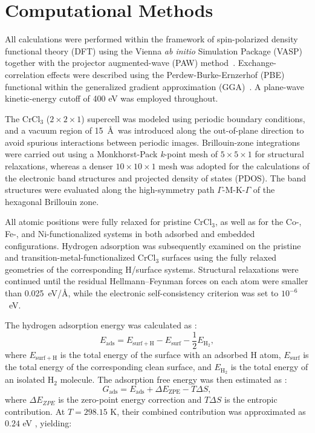 \documentclass[journal=jacsat,manuscript=article]{achemso}
\begin{document}
\section{Computational Methods}

All calculations were performed within the framework of spin-polarized density functional theory (DFT) using the Vienna \textit{ab initio} Simulation Package (VASP)~\cite{Kresse1996CMS,Kresse1996PRB} together with the projector augmented-wave (PAW) method~\cite{Blochl1994,Kresse1999}. Exchange-correlation effects were described using the Perdew-Burke-Ernzerhof (PBE) functional within the generalized gradient approximation (GGA)~\cite{PhysRevLett.77.3865}. A plane-wave kinetic-energy cutoff of 400 eV was employed throughout.

The CrCl$_3$ ($2 \times 2 \times 1$) supercell was modeled using periodic boundary conditions, and a vacuum region of 15~\AA\ was introduced along the out-of-plane direction to avoid spurious interactions between periodic images. Brillouin-zone integrations were carried out using a Monkhorst-Pack \cite{Monkhorst1976} \textit{k}-point mesh of $5 \times 5 \times 1$ for structural relaxations, whereas a denser $10 \times 10 \times 1$ mesh was adopted for the calculations of the electronic band structures and projected density of states (PDOS). The band structures were evaluated along the high-symmetry path $\Gamma$-M-K-$\Gamma$ of the hexagonal Brillouin zone.

All atomic positions were fully relaxed for pristine CrCl$_3$, as well as for the Co-, Fe-, and Ni-functionalized systems in both adsorbed and embedded configurations. Hydrogen adsorption was subsequently examined on the pristine and transition-metal-functionalized CrCl$_3$ surfaces using the fully relaxed geometries of the corresponding H/surface systems. Structural relaxations were continued until the residual Hellmann--Feynman forces on each atom were smaller than 0.025~eV/\AA, while the electronic self-consistency criterion was set to $10^{-6}$~eV.

The hydrogen adsorption energy was calculated as \cite{https://doi.org/10.1002/eem2.12204,doi:10.1021/acsomega.5c07529}:
\begin{equation}
    E_{\mathrm{ads}} = E_{\mathrm{surf+H}} - E_{\mathrm{surf}} - \frac{1}{2}E_{\mathrm{H_2}},
\end{equation}
where $E_{\mathrm{surf+H}}$ is the total energy of the surface with an adsorbed H atom, $E_{\mathrm{surf}}$ is the total energy of the corresponding clean surface, and $E_{\mathrm{H_2}}$ is the total energy of an isolated H$_2$ molecule. The adsorption free energy was then estimated as \cite{https://doi.org/10.1002/eem2.12204,doi:10.1021/acsomega.5c07529}:
\begin{equation}
    G_{\mathrm{ads}} = E_{\mathrm{ads}} + \Delta E_{\mathrm{ZPE}} - T\Delta S,
\end{equation}
where $\Delta E_{ZPE}$ is the zero-point energy correction and $T\Delta S$ is the entropic contribution. At $T = 298.15$ K, their combined contribution was approximated as $0.24$ eV \cite{Norskov_2005}, yielding:
\end{document}
